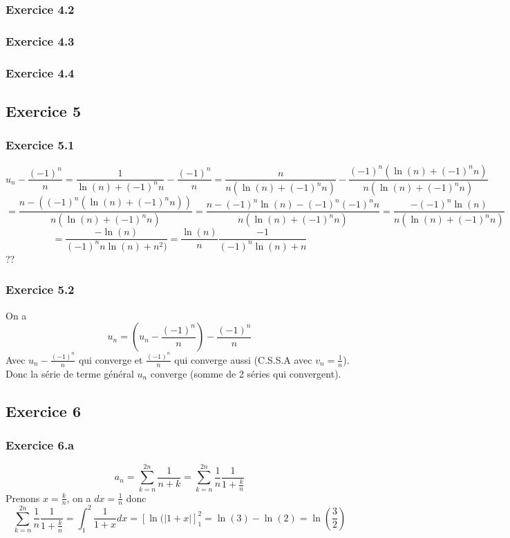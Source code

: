 \documentclass[]{book}
\theoremstyle{definition}
\begin{document}
\subsubsection*{Exercice 4.2}

\subsubsection*{Exercice 4.3}

\subsubsection*{Exercice 4.4}

\subsection*{Exercice 5}
\subsubsection*{Exercice 5.1}
$$u_n - \frac{(-1)^n}{n} = \frac{1}{\ln(n)+(-1)^{n}n} - \frac{(-1)^n}{n} = \frac{n}{n(\ln(n)+(-1)^{n}n)} - \frac{(-1)^n(\ln(n)+(-1)^{n}n)}{n(\ln(n)+(-1)^{n}n)}$$
$$=\frac{n-((-1)^n(\ln(n)+(-1)^{n}n))}{n(\ln(n)+(-1)^{n}n)} = \frac{n-(-1)^n\ln(n)-(-1)^{n}(-1)^{n}n}{n(\ln(n)+(-1)^{n}n)} = \frac{-(-1)^n\ln(n)}{n(\ln(n)+(-1)^{n}n)}$$
$$=\frac{-\ln(n)}{(-1)^{n}n\ln(n)+n^2)} = \frac{\ln(n)}{n}\frac{-1}{(-1)^{n}\ln(n)+n}$$
??

\subsubsection*{Exercice 5.2}
On a 
$$u_n = \left( u_n - \frac{(-1)^n}{n} \right) - \frac{(-1)^n}{n}$$
Avec $u_n - \frac{(-1)^n}{n}$ qui converge et $\frac{(-1)^n}{n}$ qui converge aussi (C.S.S.A avec $v_n = \frac{1}{n}$). Donc la s\'erie de terme g\'en\'eral $u_n$ converge (somme de 2 s\'eries qui convergent). 


\subsection*{Exercice 6}
\subsubsection*{Exercice 6.a}
$$a_n = \sum_{k=n}^{2n}\frac{1}{n+k} = \sum_{k=n}^{2n}\frac{1}{n}\frac{1}{1+\frac{k}{n}}$$
Prenons $x=\frac{k}{n}$, on a $dx=\frac{1}{n}$ donc
$$\sum_{k=n}^{2n}\frac{1}{n}\frac{1}{1+\frac{k}{n}} = \int_{1}^{2} \frac{1}{1+x}dx = \left[\ln(|1+x|\right]_{1}^{2} = \ln(3)-\ln(2) = \ln(\frac{3}{2})$$
\end{document}
